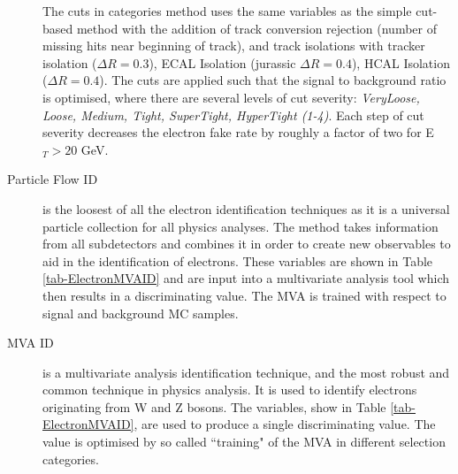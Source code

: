 \begin{description}
	The cuts in categories method uses the same variables as the simple cut-based method with the addition of track conversion rejection (number of missing hits near beginning of track), and track isolations with tracker isolation ($\Delta R = 0.3$), ECAL Isolation (jurassic $\Delta R = 0.4$), HCAL Isolation ($\Delta R = 0.4$). The cuts are applied such that the signal to background ratio is optimised, where there are several levels of cut severity: \emph{VeryLoose, Loose, Medium, Tight, SuperTight, HyperTight (1-4)}. Each step of cut severity decreases the electron fake rate by roughly a factor of two for E$_T > 20$ GeV.  \cite{CutsInCategories} 
	\item[Particle Flow ID] is the loosest of all the electron identification techniques as it is a universal particle collection for all physics analyses. The method takes information from all subdetectors and combines it in order to create new observables to aid in the identification of electrons. These variables are shown in Table \ref{tab-ElectronMVAID} and are input into a multivariate analysis tool which then results in a discriminating value. The MVA is trained with respect to signal and background MC samples. \cite{PFElectronReconstruction}
	\item[MVA ID] is a multivariate analysis identification technique, and the most robust and common technique in physics analysis. It is used to identify electrons originating from W and Z bosons. The variables, show in Table \ref{tab-ElectronMVAID}, are used to produce a single discriminating value. The value is optimised by so called ``training" of the MVA in different selection categories.
\end{description}

